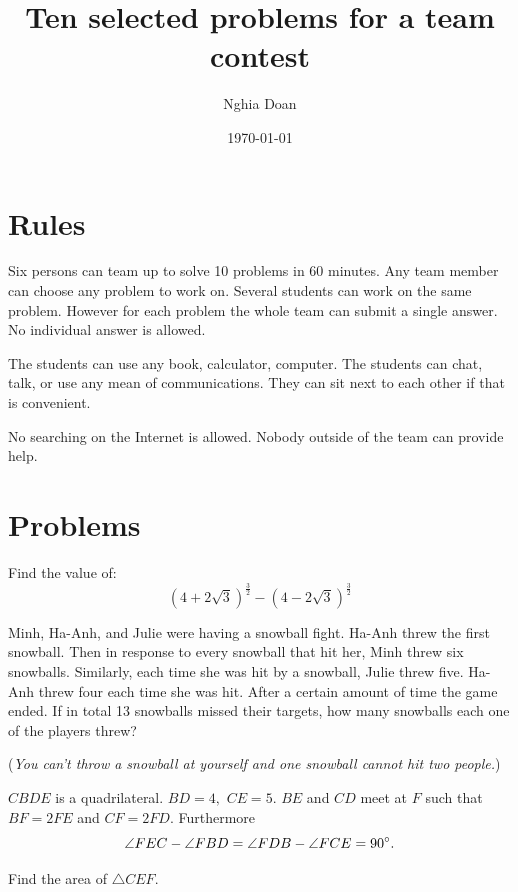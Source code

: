 \documentclass{article}
\title{Ten selected problems for a team contest}
\author{Nghia Doan}
\date{\today}
\begin{document}
\maketitle

\section{Rules}

Six persons can team up to solve 10 problems in 60 minutes.
Any team member can choose any problem to work on.
Several students can work on the same problem.
However for each problem the whole team can submit a single answer.
No individual answer is allowed.

The students can use any book, calculator, computer.
The students can chat, talk, or use any mean of communications.
They can sit next to each other if that is convenient.

No searching on the Internet is allowed. Nobody outside of the team can provide help.

\newpage

\section{Problems}

\begin{problem}
    \label{problem:23-24-SM2-S4-CT-P1}
    Find the value of:
    \[
        \left(4 + 2\sqrt{3}\right)^{\frac{3}{2}} - \left(4 - 2\sqrt{3}\right)^{\frac{3}{2}}
    \]
\end{problem}

\bigbreak

\begin{problem}
    Minh, Ha-Anh, and Julie were having a snowball fight.
    Ha-Anh threw the first snowball. Then in response to every snowball that hit her, Minh threw six snowballs.
    Similarly, each time she was hit by a snowball, Julie threw five. Ha-Anh threw four each time she was hit.
    After a certain amount of time the game ended.
    If in total 13 snowballs missed their targets, how many snowballs each one of the players threw?

    (\textit{You can't throw a snowball at yourself and one snowball cannot hit two people.})
\end{problem}

\bigbreak

\begin{problem}
    $CBDE$ is a quadrilateral. $BD=4,$ $CE=5.$ $BE$ and $CD$ meet at $F$ such that $BF = 2FE$ and $CF = 2 FD.$ Furthermore
    \[
        \angle FEC - \angle FBD = \angle FDB - \angle FCE = 90^\circ. 
    \]

    Find the area of $\triangle CEF.$
\end{problem}
\end{document}
